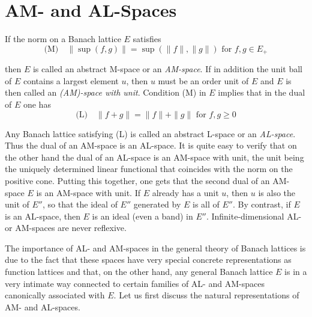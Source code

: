 \section{AM- and AL-Spaces}\label{sec:c1-4}

If the norm on a Banach lattice $ E $ satisfies
\begin{equation}\label{eq:c1-2}
\text{(M)} \quad \|\sup(f,g)\| = \sup(\|f\|,\|g\|) \text{ for } f, g \in E_{+}
\end{equation}

then $ E $ is called an abstract M-space or an \emph{AM-space}.
If in addition the unit ball of $ E $ contains a largest element $ u $, then $ u $ must be an order unit of $ E $ and $ E $ is then called an \emph{(AM)-space with unit}.
Condition (M) in $ E $ implies that in the dual of $ E $ one has
\begin{equation}\label{eq:c1-3}
\text{(L)} \quad \|f + g\| = \|f\| + \|g\| \text{ for } f, g \geq 0
\end{equation}


\pagebreak

Any Banach lattice satisfying (L) is called an abstract L-space or an \emph{AL-space}.
Thus the dual of an AM-space is an AL-space.
It is quite easy to verify that on the other hand the dual of an AL-space is an AM-space with unit, the unit being the uniquely determined linear functional that coincides with the norm on the positive cone.
Putting this together, one gets that the second dual of an AM-space $ E $ is an AM-space with unit.
If $ E $ already has a unit $ u $, then $ u $ is also the unit of $ E'' $, so that the ideal of $ E'' $ generated by $ E $ is all of $ E'' $.
By contrast, if $ E $ is an AL-space, then $ E $ is an ideal (even a band) in $ E'' $.
Infinite-dimensional AL- or AM-spaces are never reflexive.

The importance of AL- and AM-spaces in the general theory of Banach lattices is due to the fact that these spaces have very special concrete representations as function lattices and that, on the other hand, any general Banach lattice $ E $ is in a very intimate way connected to certain families of AL- and AM-spaces canonically associated with $ E $.
Let us first discuss the natural representations of AM- and AL-spaces.

